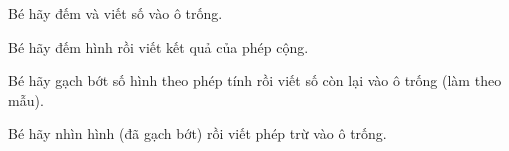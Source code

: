 \documentclass[../main.tex]{subfiles}
\begin{document}

\begin{bt}
    Bé hãy đếm và viết số vào ô trống.
    \TTbatdauhinh
    {\centering
    \hfill{}\hfill{}\par\vspace{4pt}
    \hfill{}\hfill{}\par}
\end{bt}

\begin{bt}
    Bé hãy đếm hình rồi viết kết quả của phép cộng.
    \TTbatdauhinh
    {\centering
    \PHcach
    \PHcach
    \par}
\end{bt}


\begin{bt}
    Bé hãy gạch bớt số hình theo phép tính rồi viết số còn lại vào ô trống (làm theo mẫu).
    \TTbatdauhinh
    {\centering
    \PHcach
    \PHcach
    \par}
\end{bt}

\newpage
\begin{bt}
    Bé hãy nhìn hình (đã gạch bớt) rồi viết phép trừ vào ô trống.
    \TTbatdauhinh
    {\centering
    \PHcach
    \PHcach
    \PHcach
    \par}
\end{bt}
\end{document}
